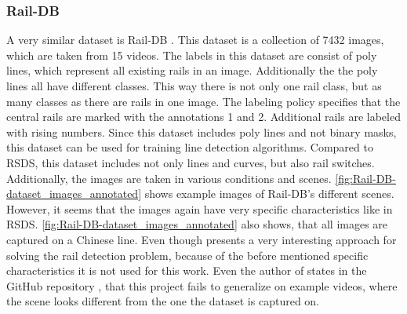 \subsubsection{Rail-DB}
A very similar dataset is Rail-DB \cite{li2022rail}.
This dataset is a collection of 7432 images, which are taken from 15 videos.
The labels in this dataset are consist of poly lines, which represent all existing rails in an image.
Additionally the the poly lines all have different classes. This way there is not only one rail class, but as many classes as there are rails in one image.
The labeling policy specifies that the central rails are marked with the annotations 1 and 2.
Additional rails are labeled with rising numbers.
Since this dataset includes poly lines and not binary masks, this dataset can be used for training line detection algorithms.
Compared to \ac{RSDS}, this dataset includes not only lines and curves, but also rail switches.
Additionally, the images are taken in various conditions and scenes.
\ref{fig:Rail-DB-dataset_images_annotated} shows example images of Rail-DB's different scenes.
However, it seems that the images again have very specific characteristics like in \ac{RSDS}.
\ref{fig:Rail-DB-dataset_images_annotated} also shows, that all images are captured on a Chinese line.
Even though \cite{li2022rail} presents a very interesting approach for solving the rail detection problem,
because of the before mentioned specific characteristics it is not used for this work. Even the author of \cite{li2022rail} states in the GitHub repository \cite{railNet2022GitHub},
that this project fails to generalize on example videos, where the scene looks different from the one the dataset is captured on.

